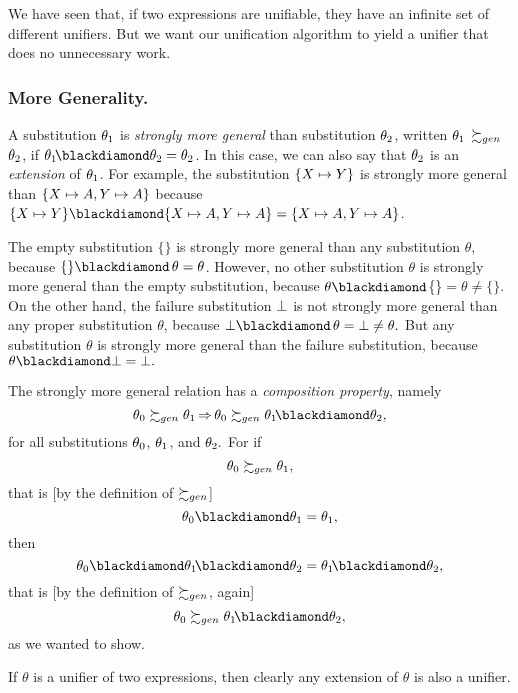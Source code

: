 \documentclass[runningheads]{llncs}
\DeclareMathOperator{\uimplies}{\Rightarrow}
\begin{document}
 
 
 We have seen that, if two expressions are unifiable, they have an infinite set of different unifiers.  But we want our unification algorithm to yield a unifier that does no unnecessary work. 
 
 \subsubsection{More Generality.}  A substitution $\theta_{1}$ is \emph{strongly more general} than substitution $\theta_{2}$, written  $\theta_{1}$ $ \succsim_{gen}$ $\theta_{2}$, if $\thet{1}\! \compose \thet{2} = \thet{2}$. In this case, we can also say that $\theta_{2}$ is an \emph{extension} of $\theta_{1}$.  For example, the substitution $\{X \mapsto Y\}$ is strongly more general than $\{X \mapsto A, Y \mapsto A\}$ because $\{\var{X} \mapsto \var{Y}\} \compose \{\var{X} \mapsto A, \var{Y} \mapsto A\} = \{\var{X} \mapsto A, \var{Y} \mapsto A\}$. 
 
 The empty substitution $\{\}$ is strongly more general than any substitution $\theta$, because $\{\} \compose \, \theta = \theta$. However, no other substitution $\theta$ is strongly more general than the empty substitution, because $\theta \compose $\{\}$= \theta \neq \{\}.$ On the other hand, the failure substitution $\bot$ is not strongly more general than any proper substitution $\theta$, because $\fail \compose \, \theta = \fail \neq \theta.$ But any substitution $\theta$ is strongly more general than the failure substitution, because $\theta \compose \fail = \fail.$

 The strongly more general relation has a \emph{composition property}, namely
 \[\thet{0} \moregen \thet{1} \uimplies \thet{0} \moregen \thet{1}\! \compose \thet{2},\]
for all substitutions $\theta_{0}$, $\theta_{1}$, and $\theta_{2}.$  For if
\[\theta_{0} \succsim_{gen} \theta_{1},\]
that is [by the definition of $\succsim_{gen}$]
\[\thet{0} \compose \thet{1} = \thet{1},\]
then
\[\thet{0} \compose \thet{1}\! \compose \thet{2} = \thet{1}\! \compose \thet{2},\]
that is [by the definition of $\succsim_{gen}$, again]
\[\thet{0} \moregen \thet{1}\! \compose \thet{2},\]
as we wanted to show.

 If $\theta$ is a unifier of two expressions, then clearly any extension of $\theta$ is also a unifier.  
\end{document}
